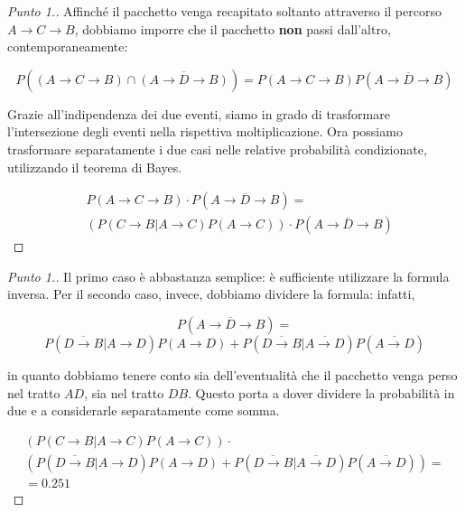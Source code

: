 \documentclass{beamer}
\renewcommand\qedsymbol{$\blacksquare$}
\begin{document}
\begin{frame}
	\begin{proof}[Punto 1.]\renewcommand{\qedsymbol}{$\longrightarrow$}
		Affinché il pacchetto venga recapitato soltanto attraverso il percorso $A \rightarrow C \rightarrow B$, dobbiamo imporre che il pacchetto \textbf{non} passi dall'altro, contemporaneamente:

		\[
			P((A \rightarrow C \rightarrow B) \cap \overline{(A \rightarrow D \rightarrow B)}) = P(A \rightarrow C \rightarrow B)P(\overline{A \rightarrow D \rightarrow B})
		\]

		Grazie all'indipendenza dei due eventi, siamo in grado di trasformare l'intersezione degli eventi nella rispettiva moltiplicazione. Ora possiamo trasformare separatamente i due casi nelle relative probabilità condizionate, utilizzando il teorema di Bayes.

		\begin{equation*}
			\begin{split}
				&P(A \rightarrow C \rightarrow B) \cdot P(\overline{A \rightarrow D \rightarrow B}) = \\
				&(P(C \rightarrow B|A \rightarrow C)P(A \rightarrow C)) \cdot P(\overline{A \rightarrow D \rightarrow B})
			\end{split}
		\end{equation*}
		\qedhere
	\end{proof}
\end{frame}
\begin{frame}
	\begin{proof}[Punto 1.]

		Il primo caso è abbastanza semplice: è sufficiente utilizzare la formula inversa. Per il secondo caso, invece, dobbiamo dividere la formula: infatti,

		\[
			P(\overline{A \rightarrow D \rightarrow B}) =
		\]
		\[
			P(\overline{D \rightarrow B}|A \rightarrow D)P(A \rightarrow D) + P(\overline{D \rightarrow B}|\overline{A \rightarrow D})P(\overline{A \rightarrow D})
		\]

		in quanto dobbiamo tenere conto sia dell'eventualità che il pacchetto venga perso nel tratto $AD$, sia nel tratto $DB$. Questo porta a dover dividere la probabilità in due e a considerarle separatamente come somma.

		\begin{gather*}
			\left( P(C \rightarrow B|A \rightarrow C)P(A \rightarrow C) \right) \cdot \\
			\left( P(\overline{D \rightarrow B}|A \rightarrow D)P(A \rightarrow D) + P(\overline{D \rightarrow B}|\overline{A \rightarrow D})P(\overline{A \rightarrow D}) \right) = \\
			= 0.251
		\end{gather*} \qedhere
	\end{proof}
\end{frame}
\end{document}
